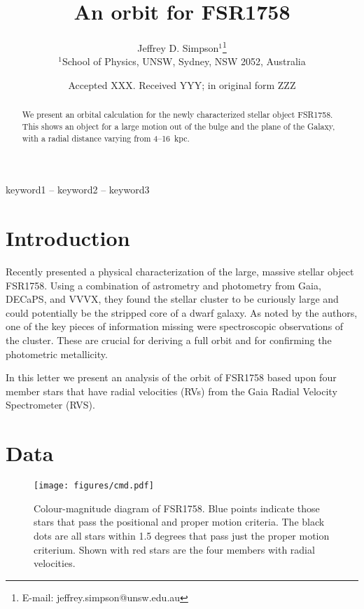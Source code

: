 \documentclass[fleqn,usenatbib,letters]{mnras}
\title[An orbit for FSR1758]{An orbit for FSR1758}
\author[Simpson et al.]{
Jeffrey D. Simpson$^{1}$\thanks{E-mail: jeffrey.simpson@unsw.edu.au}
\\
$^{1}$School of Physics, UNSW, Sydney, NSW 2052, Australia
}
\date{Accepted XXX. Received YYY; in original form ZZZ}
\begin{document}
\label{firstpage}
\pagerange{\pageref{firstpage}--\pageref{lastpage}}
\maketitle

\begin{abstract}
We present an orbital calculation for the newly characterized stellar object FSR1758. This shows an object for a large motion out of the bulge and the plane of the Galaxy, with a radial distance varying from 4--16~kpc.
\end{abstract}

\begin{keywords}
keyword1 -- keyword2 -- keyword3
\end{keywords}



\section{Introduction} \label{sec:intro}
Recently \citet{Barba2018} presented a physical characterization of the large, massive stellar object FSR1758. Using a combination of astrometry and photometry from Gaia, DECaPS, and VVVX, they found the stellar cluster to be curiously large and could potentially be the stripped core of a dwarf galaxy. As noted by the authors, one of the key pieces of information missing were spectroscopic observations of the cluster. These are crucial for deriving a full orbit and for confirming the photometric metallicity.

In this letter we present an analysis of the orbit of FSR1758 based upon four member stars that have radial velocities (RVs) from the Gaia Radial Velocity Spectrometer (RVS).

\section{Data}

\begin{figure*}
\texttt{[image: figures/cmd.pdf]}
\caption{Colour-magnitude diagram of FSR1758. Blue points indicate those stars that pass the positional and proper motion criteria. The black dots are all stars within 1.5 degrees that pass just the proper motion criterium. Shown with red stars are the four members with radial velocities. \label{fig:cmd}}
\end{figure*}
\end{document}
